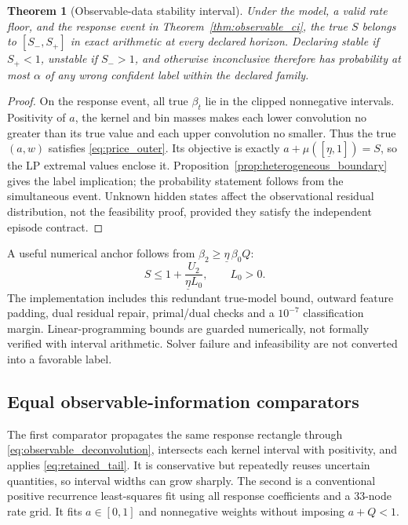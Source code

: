 \documentclass[11pt,a4paper]{article}
\newtheorem{theorem}{Theorem}[section]
\theoremstyle{definition}
\theoremstyle{remark}
\begin{document}
\begin{theorem}[Observable-data stability interval]
\label{thm:observable_stability}
Under the model, a valid rate floor, and the response event in Theorem~\ref{thm:observable_ci}, the true $S$ belongs to $[S_-,S_+]$ in exact arithmetic at every declared horizon. Declaring stable if $S_+<1$, unstable if $S_->1$, and otherwise inconclusive therefore has probability at most $\alpha$ of any wrong confident label within the declared family.
\end{theorem}
\begin{proof}
On the response event, all true $\beta_t$ lie in the clipped nonnegative intervals. Positivity of $a$, the kernel and bin masses makes each lower convolution no greater than its true value and each upper convolution no smaller. Thus the true $(a,w)$ satisfies \eqref{eq:price_outer}. Its objective is exactly $a+\mu([\underline\eta,1])=S$, so the LP extremal values enclose it. Proposition~\ref{prop:heterogeneous_boundary} gives the label implication; the probability statement follows from the simultaneous event. Unknown hidden states affect the observational residual distribution, not the feasibility proof, provided they satisfy the independent episode contract.
\end{proof}

A useful numerical anchor follows from $\beta_2\ge\underline\eta\,\beta_0Q$:
\begin{equation}
 S\le 1+\frac{U_2}{\underline\eta L_0},\qquad L_0>0.
 \label{eq:observable_cap}
\end{equation}
The implementation includes this redundant true-model bound, outward feature padding, dual residual repair, primal/dual checks and a $10^{-7}$ classification margin. Linear-programming bounds are guarded numerically, not formally verified with interval arithmetic. Solver failure and infeasibility are not converted into a favorable label.

\subsection{Equal observable-information comparators}
The first comparator propagates the same response rectangle through \eqref{eq:observable_deconvolution}, intersects each kernel interval with positivity, and applies \eqref{eq:retained_tail}. It is conservative but repeatedly reuses uncertain quantities, so interval widths can grow sharply. The second is a conventional positive recurrence least-squares fit using all response coefficients and a 33-node rate grid. It fits $a\in[0,1]$ and nonnegative weights without imposing $a+Q<1$.
\end{document}

